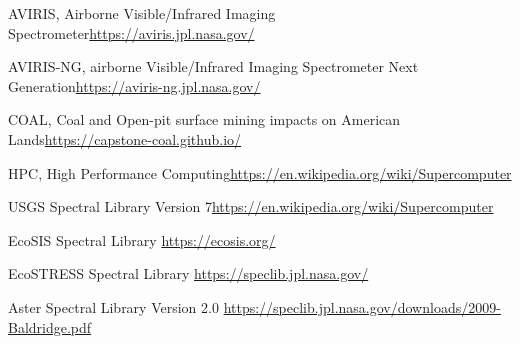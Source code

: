 \documentclass[a4paper,12pt]{article}
\begin{document}
\noindent [2] AVIRIS, Airborne Visible/Infrared Imaging Spectrometer\newline \url{https://aviris.jpl.nasa.gov/} \newline

\noindent [3] AVIRIS-NG, airborne Visible/Infrared Imaging Spectrometer Next Generation\newline \url{https://aviris-ng.jpl.nasa.gov/}\newline

\noindent [4] COAL, Coal and Open-pit surface mining impacts on American Lands\newline \url{https://capstone-coal.github.io/} \newline

\noindent [5] HPC, High Performance Computing\newline \url{https://en.wikipedia.org/wiki/Supercomputer}\newline

\noindent [6] USGS Spectral Library Version 7\newline \url{https://en.wikipedia.org/wiki/Supercomputer}\newline

\noindent [7] EcoSIS Spectral Library \newline \url{https://ecosis.org/}\newline

\noindent [8] EcoSTRESS Spectral Library \newline \url{https://speclib.jpl.nasa.gov/}\newline

\noindent [9] Aster Spectral Library Version 2.0 \newline
\url{https://speclib.jpl.nasa.gov/downloads/2009-Baldridge.pdf}\newline
\end{document}
